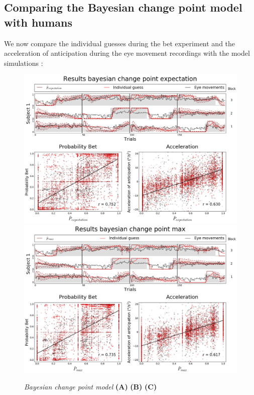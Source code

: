 \documentclass[profile,final,english, draft]{article}%
\begin{document}

\subsection{Comparing the Bayesian change point model with humans}

We now compare the individual guesses during the bet experiment and the acceleration of anticipation during the eye movement recordings with the model simulations :


\begin{figure}%

\begin{center} 
    \includegraphics[width=1\linewidth]{results_bayesianchangepoint_e}
    \includegraphics[width=1\linewidth]{results_bayesianchangepoint_m}
\end{center}
\caption{\emph{Bayesian change point model} \textbf{(A)} 
\textbf{(B)} 
\textbf{(C)}  }
\label{fig:results_psycho}
\end{figure}
\end{document}
